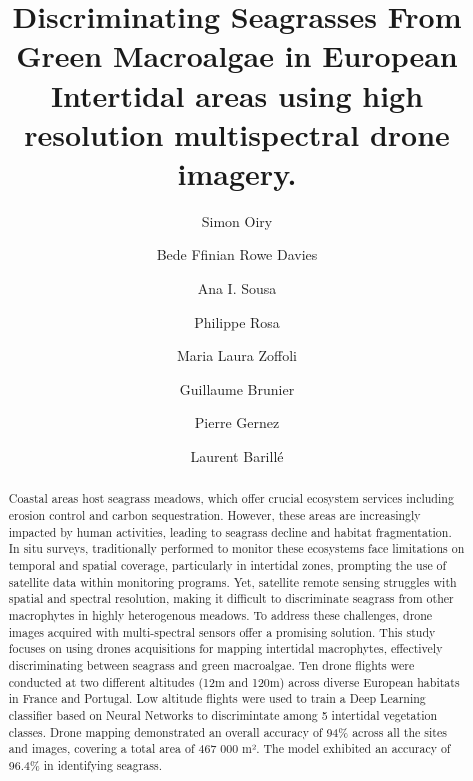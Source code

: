 \documentclass[
  number]{elsarticle}
\begin{document}
\begin{frontmatter}
\title{Discriminating Seagrasses From Green Macroalgae in European
Intertidal areas using high resolution multispectral drone imagery.}
\author[1]{Simon Oiry%
%
}
\author[1]{Bede Ffinian Rowe Davies%
%
}

\author[2]{Ana I. Sousa%
%
}

\author[1]{Philippe Rosa%
%
}

\author[3]{Maria Laura Zoffoli%
%
}

\author[4]{Guillaume Brunier%
%
}

\author[1]{Pierre Gernez%
%
}

\author[1]{Laurent Barillé%
%
}











        
\begin{abstract}
Coastal areas host seagrass meadows, which offer crucial ecosystem
services including erosion control and carbon sequestration. However,
these areas are increasingly impacted by human activities, leading to
seagrass decline and habitat fragmentation. In situ surveys,
traditionally performed to monitor these ecosystems face limitations on
temporal and spatial coverage, particularly in intertidal zones,
prompting the use of satellite data within monitoring programs. Yet,
satellite remote sensing struggles with spatial and spectral resolution,
making it difficult to discriminate seagrass from other macrophytes in
highly heterogenous meadows. To address these challenges, drone images
acquired with multi-spectral sensors offer a promising solution. This
study focuses on using drones acquisitions for mapping intertidal
macrophytes, effectively discriminating between seagrass and green
macroalgae. Ten drone flights were conducted at two different altitudes
(12m and 120m) across diverse European habitats in France and Portugal.
Low altitude flights were used to train a Deep Learning classifier based
on Neural Networks to discrimintate among 5 intertidal vegetation
classes. Drone mapping demonstrated an overall accuracy of 94\% across
all the sites and images, covering a total area of 467 000 m². The model
exhibited an accuracy of 96.4\% in identifying seagrass.
\end{abstract}






\end{frontmatter}
\end{document}
